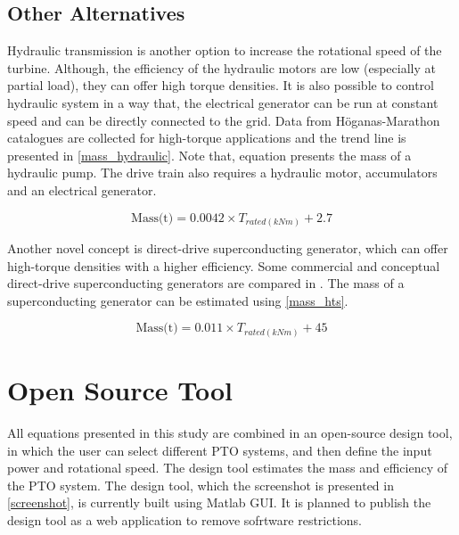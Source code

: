 \documentclass{article}\usepackage{graphicx, color}
\begin{document}

\subsection{Other Alternatives}

Hydraulic transmission is another option to increase the rotational speed of the turbine. Although, the efficiency of the hydraulic motors are low (especially at partial load), they can offer high torque densities. It is also possible to control hydraulic system in a way that, the electrical generator can be run at constant speed and can be directly connected to the grid. Data from H\"{o}ganas-Marathon catalogues are collected for high-torque applications \cite{Hagglunds2012} and the trend line is presented in \autoref{mass_hydraulic}. Note that, equation presents the mass of a hydraulic pump. The drive train also requires a hydraulic motor, accumulators and an electrical generator.

\begin{equation}
  \text{Mass(t)} = 0.0042 \times {T_{rated(kNm)}} + 2.7
  \label{mass_hydraulic}
\end{equation}

Another novel concept is direct-drive superconducting generator, which can offer high-torque densities with a higher efficiency. Some commercial and conceptual direct-drive superconducting generators are compared in \cite{Keysan2011b}. The mass of a superconducting generator can be estimated using \autoref{mass_hts}.

\begin{equation}
  \text{Mass(t)} = 0.011 \times {T_{rated(kNm)}} + 45
  \label{mass_hts}
\end{equation}

\section{Open Source Tool}
\label{access}
All equations presented in this study are combined in an open-source design tool, in which the user can select different PTO systems, and then define the input power and rotational speed. The design tool estimates the mass and efficiency of the PTO system. The design tool, which the screenshot is presented in \autoref{screenshot}, is currently built using Matlab GUI. It is planned to publish the design tool as a web application to remove sofrtware restrictions. 
\end{document}
